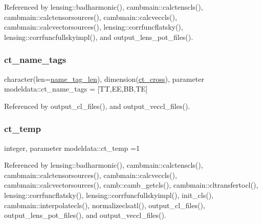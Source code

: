 Referenced by lensing\+::badharmonic(), cambmain\+::calctenscls(), cambmain\+::calctensorsources(), cambmain\+::calcveccls(), cambmain\+::calcvectorsources(), lensing\+::corrfuncflatsky(), lensing\+::corrfuncfullskyimpl(), and output\+\_\+lens\+\_\+pot\+\_\+files().

\mbox{\label{namespacemodeldata_add55f08ccdcc65479fca4cd2858b420d}} 
\subsubsection{\texorpdfstring{ct\+\_\+name\+\_\+tags}{ct\_name\_tags}}
{\footnotesize\ttfamily character(len=\mbox{\hyperlink{namespacemodeldata_a2ead755d89390eb003edcde34ebf2c99}{name\+\_\+tag\+\_\+len}}), dimension(\mbox{\hyperlink{namespacemodeldata_a76668d6bad37db06c7b9a47cdeba14dc}{ct\+\_\+cross}}), parameter modeldata\+::ct\+\_\+name\+\_\+tags = \mbox{[}\textquotesingle{}TT\textquotesingle{},\textquotesingle{}EE\textquotesingle{},\textquotesingle{}BB\textquotesingle{},\textquotesingle{}TE\textquotesingle{}\mbox{]}}



Referenced by output\+\_\+cl\+\_\+files(), and output\+\_\+veccl\+\_\+files().

\mbox{\label{namespacemodeldata_a0852164e9866929946aab4fdf78ca2b2}} 
\subsubsection{\texorpdfstring{ct\+\_\+temp}{ct\_temp}}
{\footnotesize\ttfamily integer, parameter modeldata\+::ct\+\_\+temp =1}



Referenced by lensing\+::badharmonic(), cambmain\+::calctenscls(), cambmain\+::calctensorsources(), cambmain\+::calcveccls(), cambmain\+::calcvectorsources(), camb\+::camb\+\_\+getcls(), cambmain\+::cltransfertocl(), lensing\+::corrfuncflatsky(), lensing\+::corrfuncfullskyimpl(), init\+\_\+cls(), cambmain\+::interpolatecls(), normalizeclsatl(), output\+\_\+cl\+\_\+files(), output\+\_\+lens\+\_\+pot\+\_\+files(), and output\+\_\+veccl\+\_\+files().

